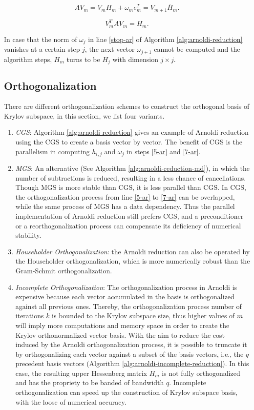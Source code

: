 \begin{equation}
AV_m = V_m H_m + \omega_me_m^T = V_{m+1}\bar{H}_m.
\end{equation}

\begin{equation}
V_m^T A V_m = H_m.
\end{equation}

In case that the norm of $\omega_j$ in line \ref{stop-ar} of  Algorithm \ref{alg:arnoldi-reduction} vanishes at a certain step $j$, the next vector $\omega_{j+1}$ cannot be computed and the algorithm steps, $H_m$ turns to be $H_j$ with dimension $j \times j$.


\subsection{Orthogonalization}

There are different orthogonalization schemes to construct the orthogonal basis of Krylov subspace, in this section, we list four variants.

\begin{enumerate}
	\item \textit{CGS}: Algorithm \ref{alg:arnoldi-reduction} gives an example of Arnoldi reduction using the CGS to create a basis vector by vector. The benefit of CGS is the parallelism in computing $h_{i,j}$ and $\omega_j$ in steps \ref{5-ar} and \ref{7-ar}.
	\item \textit{MGS}: An alternative (See Algorithm \ref{alg:arnoldi-reduction-md}), in which the number of subtractions is reduced, resulting in a less chance of cancellations. Though MGS is more stable than CGS, it is less parallel than CGS. In CGS, the orthogonalization process from line \ref{5-ar} to \ref{7-ar} can be overlapped, while the same process of MGS has a data dependency. Thus the parallel implementation of Arnoldi reduction still prefers CGS, and a preconditioner or a reorthogonalization process can compensate its deficiency of numerical stability.
	\item \textit{Householder Orthogonalization}: the  Arnoldi reduction can also be operated by the Householder orthogonalization, which is more numerically robust than the Gram-Schmit orthogonalization.
	\item \textit{Incomplete Orthogonalization}: The orthogonalization process in Arnoldi is expensive because each vector accumulated in the basis is orthogonalized against all previous ones. Thereby, the orthogonalization process number of iterations $k$ is bounded to the Krylov subspace size, thus higher values of $m$ will imply more computations and memory space in order to create the Krylov orthonormalized vector basis. With the aim to reduce the cost induced by the Arnoldi orthogonalization process, it is possible to truncate it by orthogonalizing each vector against a subset of the basis vectors, i.e., the $q$ precedent basis vectors (Algorithm \ref{alg:arnoldi-incomplete-reduction}). In this case, the resulting upper Hessenberg matrix $H_m$ is not fully orthogonalized and has the propriety to be banded of bandwidth $q$. Incomplete orthogonalization can speed up the construction of Krylov subspace basis, with the loose of numerical accuracy.
\end{enumerate}

